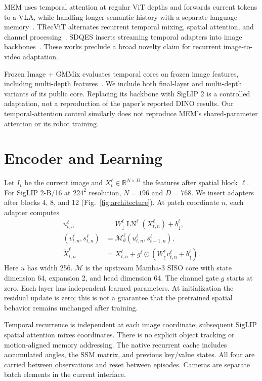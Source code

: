 \documentclass[letterpaper,10pt,conference]{ieeeconf}
\begin{document}
MEM uses temporal attention at regular ViT depths and forwards current
tokens to a VLA, while handling longer semantic history with a separate
language memory~\cite{mem}. TRecViT alternates recurrent temporal mixing,
spatial attention, and channel processing~\cite{trecvit}. SDQES inserts
streaming temporal adapters into image backbones~\cite{sdqes}. These works
preclude a broad novelty claim for recurrent image-to-video adaptation.

Frozen Image + GMMix evaluates temporal cores on frozen image features,
including multi-depth features~\cite{gmmix}. We include both final-layer
and multi-depth variants of its public core. Replacing its backbone with
SigLIP 2 is a controlled adaptation, not a reproduction of the paper's
reported DINO results. Our temporal-attention control similarly does not
reproduce MEM's shared-parameter attention or its robot training.

\section{Encoder and Learning}

Let $I_t$ be the current image and $X_t^\ell\in\mathbb{R}^{N\times D}$
the features after spatial block $\ell$. For SigLIP 2-B/16 at $224^2$
resolution, $N=196$ and $D=768$. We insert adapters after blocks 4, 8,
and 12 (Fig.~\ref{fig:architecture}). At patch coordinate $n$, each adapter computes
\begin{align}
 u_{t,n}^\ell &= W_\downarrow^\ell
       \operatorname{LN}^\ell(X_{t,n}^\ell)+b_\downarrow^\ell,\\
 (v_{t,n}^\ell,s_{t,n}^\ell) &=
       \mathcal{M}_\theta^\ell(u_{t,n}^\ell,s_{t-1,n}^\ell),\\
 \widetilde X_{t,n}^\ell &= X_{t,n}^\ell+
       g^\ell\odot(W_\uparrow^\ell v_{t,n}^\ell+b_\uparrow^\ell).
\end{align}
Here $u$ has width 256. $\mathcal M$ is the upstream Mamba-3 SISO core
with state dimension 64, expansion 2, and head dimension 64. The channel
gate $g$ starts at zero. Each layer has independent learned parameters.
At initialization the residual update is zero; this is not a guarantee
that the pretrained spatial behavior remains unchanged after training.

Temporal recurrence is independent at each image coordinate; subsequent
SigLIP spatial attention mixes coordinates. There is no explicit object
tracking or motion-aligned memory addressing. The native recurrent cache
includes accumulated angles, the SSM matrix, and previous key/value
states. All four are carried between observations and reset between
episodes. Cameras are separate batch elements in the current interface.
\end{document}
